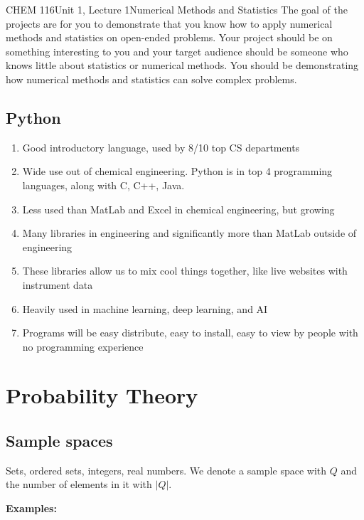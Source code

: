 \documentclass{article}
\renewcommand{\headrulewidth}{0.0pt}
\begin{document}
\begin{tdoc}{CHEM 116}{Unit 1, Lecture 1}{Numerical Methods and Statistics}
The goal of the projects are for you to demonstrate that you know how to apply numerical methods and statistics on open-ended problems. Your project should be on something interesting to you and your target audience should be someone who knows little about statistics or numerical methods. You should be demonstrating how numerical methods and statistics can solve complex problems.

\subsection{Python}

\begin{enumerate}

\item Good introductory language, used by 8/10 top CS departments
\item Wide use out of chemical engineering. Python is in top 4 programming languages, along with C, C++, Java.
\item Less used than MatLab and Excel in chemical engineering, but growing
\item Many libraries in engineering and significantly more than MatLab outside of engineering
\item These libraries allow us to mix cool things together, like live websites with instrument data
\item Heavily used in machine learning, deep learning, and AI
\item Programs will be easy distribute, easy to install, easy to view by people with no programming experience

\end{enumerate}

\renewcommand{\headrulewidth}{0.4pt}

\section{Probability Theory}

\subsection{Sample spaces}

Sets, ordered sets, integers, real numbers. We denote a sample space
with $Q$ and the number of elements in it with $|Q|$.

{\bf Examples:}
\begin{enumerate}


\end{enumerate}
\end{tdoc}
\end{document}
